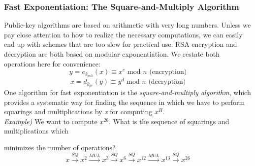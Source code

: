 \documentclass[11pt, a4paper]{article}
\newcommand{\mymod}{
    \text{ mod }
}
\newcommand{\quadra}{\xrightarrow{SQ}}
\newcommand{\moltiplica}{\xrightarrow{MUL}}
\begin{document}
\newpage
\subsubsection{Fast Exponentiation: The Square-and-Multiply Algorithm}
Public-key algorithms are based on arithmetic with very long numbers. Unless we pay close attention to how to realize the necessary computations, we can easily end up with schemes that are too slow for practical use. RSA encryption and decryption are both based on modular exponentiation. We restate both operations here for convenience:
$$y=e_{k_{pub}}(x)\equiv x^e\mymod n\text{ (encryption)}$$
$$x=d_{k_{pr}}(y)\equiv y^d\mymod n\text{ (decryption)}$$
One algorithm for fast exponentiation is the \textit{square-and-multiply algorithm}, which provides a systematic way for finding the sequence in which we have to perform squarings and multiplications by \textit{x} for computing \nolinebreak$x^H$.\\

\textit{Example)} We want to compute $x^{26}$. What is the sequence of squarings and multiplications which

minimizes the number of operations?
$$x\quadra x^2\moltiplica x^3\quadra x^6\quadra x^{12}\moltiplica x^{13}\quadra x^{26}$$
\end{document}
